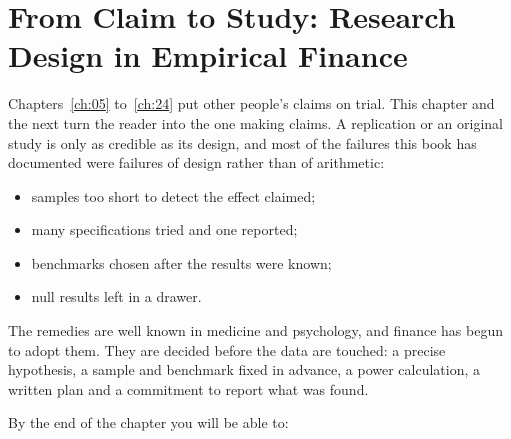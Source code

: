 \makeatletter
{}
\makeatother

\chapter{From Claim to Study: Research Design in Empirical Finance}
\label{ch:25}

Chapters~\ref{ch:05} to~\ref{ch:24} put other people's claims on trial. This chapter and the next turn the reader into the one making claims. A replication or an original study is only as credible as its design, and most of the failures this book has documented were failures of design rather than of arithmetic:

\begin{itemize}
  \item samples too short to detect the effect claimed;
  \item many specifications tried and one reported;
  \item benchmarks chosen after the results were known;
  \item null results left in a drawer.
\end{itemize}

The remedies are well known in medicine and psychology, and finance has begun to adopt them. They are decided before the data are touched: a precise hypothesis, a sample and benchmark fixed in advance, a power calculation, a written plan and a commitment to report what was found.

By the end of the chapter you will be able to:

